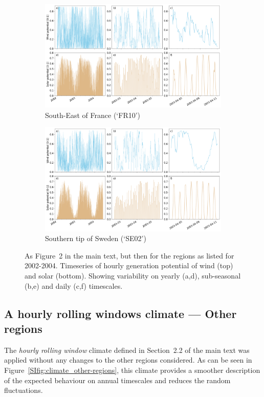 \documentclass[a4paper,11pt]{extarticle}
\begin{document}
\begin{figure}[hb]
\centering
    \begin{subfigure}[t]{\linewidth}
        \centering
        \includegraphics[width=\textwidth]{Climatological_Behaviour_FR10}
        \caption{South-East of France (`FR10')}
    \end{subfigure}
    \begin{subfigure}[t]{\linewidth}
        \centering
        \includegraphics[width=\textwidth]{Climatological_Behaviour_SE02}
        \caption{Southern tip of Sweden (`SE02')}
    \end{subfigure}
    \caption{
        As Figure~2 in the main text, but then for the regions as listed for 2002-2004.
        Timeseries of hourly generation potential of wind (top) and solar (bottom). 
        Showing variability on yearly (a,d), sub-seasonal (b,e) and daily (c,f) timescales. 
    }
    \label{SIfig:climatological_behaviour_other-regions}
\end{figure}


\subsection{A hourly rolling windows climate --- Other regions}
The \emph{hourly rolling window} climate defined in Section~2.2 of the main text was applied without any changes to the other regions considered.
As can be seen in Figure~\ref{SIfig:climate_other-regions}, this climate provides a smoother description of the expected behaviour on annual timescales and reduces the random fluctuations. 
\end{document}
